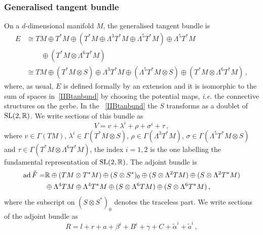 \documentclass[debug]{phd}
\begin{document}
				\subsubsection{Generalised tangent bundle}
						On a $d$-dimensional manifold $M$, the generalised tangent bundle is
								\begin{equation}\label{IIBtanbund}
									\begin{split}
										E & \cong TM\oplus T^{*}M\oplus(T^{*}M\oplus\Lambda^{3}T^{*}M\oplus\Lambda^{5}T^{*}M)\oplus\Lambda^{5}T^{*}M \\
												& \phantom{\cong \oplus} \oplus(T^{*}M\otimes\Lambda^{6}T^{*}M) \\
										 & \cong TM\oplus(T^{*}M\otimes S)\oplus\Lambda^{3}T^{*}M\oplus(\Lambda^{5}T^{*}M\otimes S)\oplus(T^{*}M\otimes\Lambda^{6}T^{*}M) \, ,
									\end{split}
								\end{equation}
						where, as usual, $E$ is defined formally by an extension and it is isomorphic to the sum of spaces in~\eqref{IIBtanbund} by choosing the potential maps, \emph{i.e.} the connective structures on the gerbe.
						In the ~\eqref{IIBtanbund} the $S$ transforms as a doublet of $\mathrm{SL}(2,\mathbb{R})$. 
						We write sections of this bundle as
								\begin{equation}\label{eq:V-IIB}
									V=v+\lambda^{i}+\rho+\sigma^{i}+\tau \, ,
								\end{equation}
						where $v\in\Gamma(TM)$, $\lambda^{i}\in\Gamma(T^{*}M\otimes S)$, $\rho\in\Gamma(\Lambda^{3}T^{*}M)$, $\sigma\in\Gamma(\Lambda^{5}T^{*}M\otimes S)$ and $\tau\in\Gamma(T^{*}M\otimes\Lambda^{6}T^{*}M)$, the index $i =1, 2$ is the one labelling the fundamental representation of $\mathrm{SL}(2,\mathbb{R})$.
						The adjoint bundle is
								\begin{equation}
									\begin{split}
										\operatorname{ad} \tilde{F} = & \mathbb{R} \oplus(TM\otimes T^{*}M) \oplus(S\otimes S^{*})_0 \oplus(S\otimes\Lambda^{2}TM) \oplus(S\otimes\Lambda^{2}T^{*}M) \\
													& \oplus\Lambda^{4}TM\oplus\Lambda^{4}T^{*}M \oplus(S \otimes\Lambda^{6}TM)\oplus(S\otimes\Lambda^{6}T^{*}M) \, ,
									\end{split}
								\end{equation}
						where the subscript on $(S\otimes S^*)_0$ denotes the traceless part. 
						We write sections of the adjoint bundle as
								\begin{equation}\label{eq:IIB-adj}
									R=l+r+a+\beta^{i}+B^{i}+\gamma+C+\tilde{\alpha}^{i}+\tilde{a}^{i} \, ,
								\end{equation}
\end{document}
